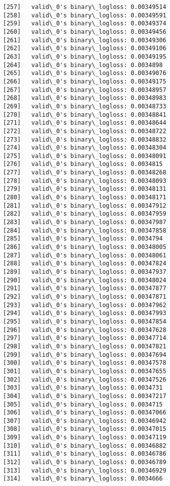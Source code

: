 \documentclass[11pt]{article}
\begin{document}
\begin{Verbatim}[commandchars=\\\{\}]
[257]	valid\_0's binary\_logloss: 0.00349514
[258]	valid\_0's binary\_logloss: 0.00349591
[259]	valid\_0's binary\_logloss: 0.00349374
[260]	valid\_0's binary\_logloss: 0.00349456
[261]	valid\_0's binary\_logloss: 0.00349306
[262]	valid\_0's binary\_logloss: 0.00349106
[263]	valid\_0's binary\_logloss: 0.00349195
[264]	valid\_0's binary\_logloss: 0.0034898
[265]	valid\_0's binary\_logloss: 0.00349076
[266]	valid\_0's binary\_logloss: 0.00349175
[267]	valid\_0's binary\_logloss: 0.00348957
[268]	valid\_0's binary\_logloss: 0.00348983
[269]	valid\_0's binary\_logloss: 0.00348733
[270]	valid\_0's binary\_logloss: 0.00348841
[271]	valid\_0's binary\_logloss: 0.00348644
[272]	valid\_0's binary\_logloss: 0.00348722
[273]	valid\_0's binary\_logloss: 0.00348832
[274]	valid\_0's binary\_logloss: 0.00348304
[275]	valid\_0's binary\_logloss: 0.00348091
[276]	valid\_0's binary\_logloss: 0.0034815
[277]	valid\_0's binary\_logloss: 0.00348268
[278]	valid\_0's binary\_logloss: 0.00348093
[279]	valid\_0's binary\_logloss: 0.00348131
[280]	valid\_0's binary\_logloss: 0.00348171
[281]	valid\_0's binary\_logloss: 0.00347912
[282]	valid\_0's binary\_logloss: 0.00347959
[283]	valid\_0's binary\_logloss: 0.00347987
[284]	valid\_0's binary\_logloss: 0.00347858
[285]	valid\_0's binary\_logloss: 0.0034794
[286]	valid\_0's binary\_logloss: 0.00348005
[287]	valid\_0's binary\_logloss: 0.00348061
[288]	valid\_0's binary\_logloss: 0.00347824
[289]	valid\_0's binary\_logloss: 0.00347937
[290]	valid\_0's binary\_logloss: 0.00348024
[291]	valid\_0's binary\_logloss: 0.00347877
[292]	valid\_0's binary\_logloss: 0.00347871
[293]	valid\_0's binary\_logloss: 0.00347962
[294]	valid\_0's binary\_logloss: 0.00347993
[295]	valid\_0's binary\_logloss: 0.00347854
[296]	valid\_0's binary\_logloss: 0.00347628
[297]	valid\_0's binary\_logloss: 0.00347714
[298]	valid\_0's binary\_logloss: 0.00347821
[299]	valid\_0's binary\_logloss: 0.00347694
[300]	valid\_0's binary\_logloss: 0.00347578
[301]	valid\_0's binary\_logloss: 0.00347655
[302]	valid\_0's binary\_logloss: 0.00347526
[303]	valid\_0's binary\_logloss: 0.0034731
[304]	valid\_0's binary\_logloss: 0.00347217
[305]	valid\_0's binary\_logloss: 0.0034715
[306]	valid\_0's binary\_logloss: 0.00347066
[307]	valid\_0's binary\_logloss: 0.00346942
[308]	valid\_0's binary\_logloss: 0.00347015
[309]	valid\_0's binary\_logloss: 0.00347119
[310]	valid\_0's binary\_logloss: 0.00346882
[311]	valid\_0's binary\_logloss: 0.00346786
[312]	valid\_0's binary\_logloss: 0.00346789
[313]	valid\_0's binary\_logloss: 0.00346929
[314]	valid\_0's binary\_logloss: 0.0034666

\end{Verbatim}
\end{document}
